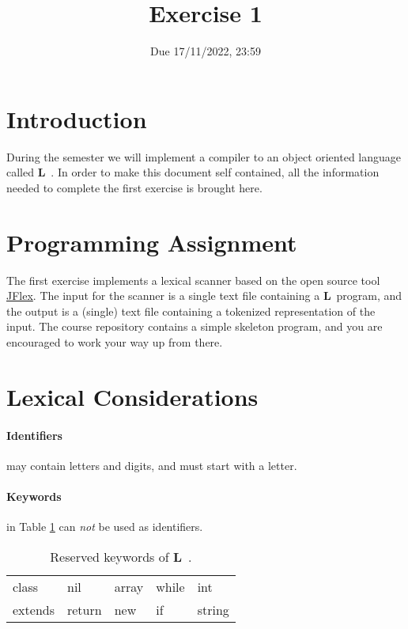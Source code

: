 \documentclass{article}
\begin{document}
\title{Exercise 1}


\date{Due 17/11/2022, 23:59}

\maketitle

\newcommand{\plname}{\textbf{L}\ }

\section{Introduction}
During the semester we will implement a compiler to an object oriented language called \plname.
In order to make this document self contained,
all the information needed to complete the first exercise is brought here.

\section{Programming Assignment}
The first exercise implements a lexical scanner based on the
open source tool \href{http://jflex.de/}{JFlex}.
The input for the scanner is a single text file containing a \plname program,
and the output is a (single) text file containing a tokenized representation of the input.
The course repository contains a simple skeleton program,
and you are encouraged to work your way up from there.

\section{Lexical Considerations}
\paragraph{Identifiers} may contain letters and digits, and must start with a letter.
\paragraph{Keywords} in Table \ref{Table_Reserved_Keywords} can \textit{not}
be used as identifiers.
\begin{table}[h]
\centering
\begin{tabular}{l l l l l}
class & nil & array & while & int \\
extends & return & new & if & string \\
\end{tabular}
\caption{
Reserved keywords of \plname.
\label{Table_Reserved_Keywords}}
\end{table}
\end{document}
